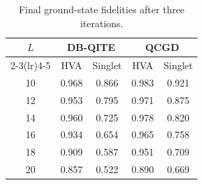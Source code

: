 \begin{table}[t]
\centering
\caption{Final ground-state fidelities after three iterations.}
\label{tab:final_fidelities}
\begin{tabular}{c cc cc}
\toprule
$L$ & \multicolumn{2}{c}{DB-QITE} & \multicolumn{2}{c}{QCGD} \\
\cmidrule(lr){2-3}\cmidrule(lr){4-5}
 & HVA & Singlet & HVA & Singlet \\
\midrule
10 & 0.968 & 0.866 & 0.983 & 0.921 \\
12 & 0.953 & 0.795 & 0.971 & 0.875 \\
14 & 0.960 & 0.725 & 0.978 & 0.820 \\
16 & 0.934 & 0.654 & 0.965 & 0.758 \\
18 & 0.909 & 0.587 & 0.951 & 0.709 \\
20 & 0.857 & 0.522 & 0.890 & 0.669 \\
\bottomrule
\end{tabular}
\end{table}